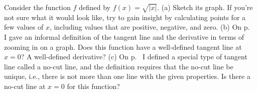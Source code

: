 Consider the function $f$ defined by $f(x)=\sqrt{|x|}$.\hwendpart
(a) Sketch its graph. If you're not sure what it would look like, try to gain
insight by calculating points for a few values of $x$, including values that
are positive, negative, and zero.\hwendpart
(b) On p.~\pageref{tangent-line-informal} I gave an informal definition of the
tangent line and the derivative in terms of zooming in on a graph. Does
this function have a well-defined tangent line at $x=0$? A well-defined
derivative?\hwendpart
(c) On p.~\pageref{no-cut} I defined a special type of tangent line called
a no-cut line, and the definition requires that the no-cut line be unique,
i.e., there is not more than one line with the given properties. Is there a no-cut line at $x=0$
for this function?
